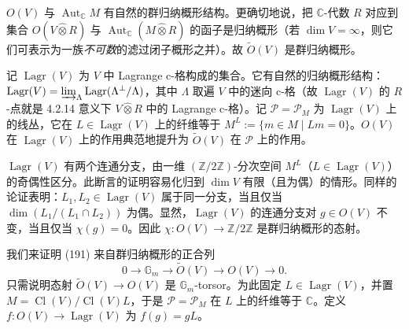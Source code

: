 $O(V)$ 与 $\operatorname{Aut}_{\mathbb{C}}M$ 有自然的群归纳概形结构。更确切地说，把 $\mathbb{C}$-代数 $R$ 对应到集合 $O(V\hat{\otimes}R)$ 与 $\operatorname{Aut}_{\mathbb{C}}(M\hat{\otimes}R)$ 的函子是归纳概形（若 $\dim V=\infty$，则它们可表示为一族\emph{不可数}的滤过闭子概形之并）。故 $\tilde{O}(V)$ 是群归纳概形。

记 $\operatorname{Lagr}(V)$ 为 $V$ 中 Lagrange c-格构成的集合。它有自然的归纳概形结构：$\operatorname{Lagr}(V)=\varinjlim_{\Lambda}\operatorname{Lagr}(\Lambda^{\perp}/\Lambda)$，其中 $\Lambda$ 取遍 $V$ 中的迷向 c-格（故 $\operatorname{Lagr}(V)$ 的 $R$-点就是 4.2.14 意义下 $V\hat{\otimes}R$ 中的 Lagrange c-格）。记 $\mathcal{P}=\mathcal{P}_{M}$ 为 $\operatorname{Lagr}(V)$ 上的线丛，它在 $L\in\operatorname{Lagr}(V)$ 上的纤维等于 $M^{L}:=\{m\in M\mid Lm=0\}$。$O(V)$ 在 $\operatorname{Lagr}(V)$ 上的作用典范地提升为 $\tilde{O}(V)$ 在 $\mathcal{P}$ 上的作用。

$\operatorname{Lagr}(V)$ 有两个连通分支，由一维 $(\mathbb{Z}/2\mathbb{Z})$-分次空间 $M^{L}$（$L\in\operatorname{Lagr}(V)$）的奇偶性区分。此断言的证明容易化归到 $\dim V$ 有限（且为偶）的情形。同样的论证表明：$L_{1},L_{2}\in\operatorname{Lagr}(V)$ 属于同一分支，当且仅当 $\dim(L_{1}/(L_{1}\cap L_{2}))$ 为偶。显然，$\operatorname{Lagr}(V)$ 的连通分支对 $g\in O(V)$ 不变，当且仅当 $\chi(g)=0$。因此 $\chi:O(V)\to\mathbb{Z}/2\mathbb{Z}$ 是群归纳概形的态射。

我们来证明 (191) 来自群归纳概形的正合列
\begin{equation}\tag{193}
0\to\mathbb{G}_{m}\to\tilde{O}(V)\to O(V)\to 0.
\end{equation}
只需说明态射 $\tilde{O}(V)\to O(V)$ 是 $\mathbb{G}_{m}$-torsor。为此固定 $L\in\operatorname{Lagr}(V)$，并置 $M=\operatorname{Cl}(V)/\operatorname{Cl}(V)L$，于是 $\mathcal{P}=\mathcal{P}_{M}$ 在 $L$ 上的纤维等于 $\mathbb{C}$。定义 $f:O(V)\to\operatorname{Lagr}(V)$ 为 $f(g)=gL$。
